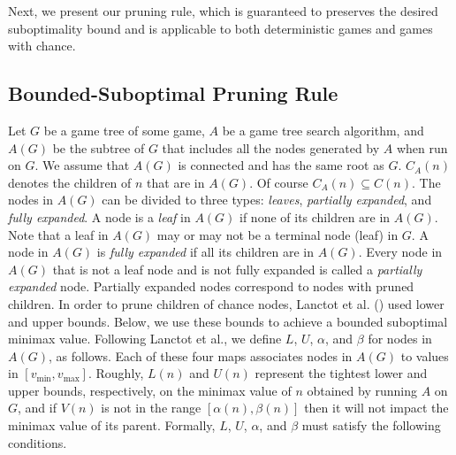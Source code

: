 \documentclass[runningheads]{llncs}
\newcommand{\MM}{\mathit{V}}
\newcommand{\pess}{\mathit{L}}
\newcommand{\opti}{\mathit{U}}
\newcommand{\vmax}{v_{\text{max}}}
\newcommand{\vmin}{v_{\text{min}}}
\begin{document}

Next, we present our pruning rule, which is guaranteed to preserves the desired suboptimality bound and is applicable to both deterministic games and games with chance. 

\subsection{Bounded-Suboptimal Pruning Rule}
Let $G$ be a game tree of some game, $A$ be a game tree search algorithm, and $A(G)$ be the subtree of $G$ that includes all the nodes generated by $A$ when run on $G$.
We assume that $A(G)$ is connected and has the same root as $G$. 
$C_A(n)$ denotes the children of $n$ that are in $A(G)$. Of course $C_A(n)\subseteq C(n)$.  
The nodes in $A(G)$ can be divided to three types: \emph{leaves}, \emph{partially expanded}, and \emph{fully expanded}.
A node is a \emph{leaf} in $A(G)$ if none of its children are in $A(G)$.
Note that a leaf in $A(G)$ may or may not be a terminal node (leaf) in $G$.  
A node in $A(G)$ is \emph{fully expanded} if all its children are in $A(G)$.
Every node in $A(G)$ that is not a leaf node and is not fully expanded is called a \emph{partially expanded} node. 
Partially expanded nodes correspond to nodes with pruned children.
In order to prune children of chance nodes, Lanctot et al. (\citeyear{lanctot2013monte}) used lower and upper bounds. Below, we use these bounds to achieve a bounded suboptimal minimax value.
Following Lanctot et al., we define $\pess$, $\opti$, $\alpha$, and $\beta$ for nodes in $A(G)$, as follows. 
Each of these four maps associates nodes in $A(G)$ to values in $[\vmin, \vmax]$. Roughly, $\pess(n)$ and $\opti(n)$ represent the tightest lower and upper bounds, respectively, on the minimax value of $n$  obtained by running $A$ on $G$, and if $\MM(n)$ is not in the range $[\alpha(n),\beta(n)]$ then it will not impact the minimax value of its parent. Formally, $\pess$, $\opti$, $\alpha$, and $\beta$ must satisfy the following conditions. 
\end{document}
